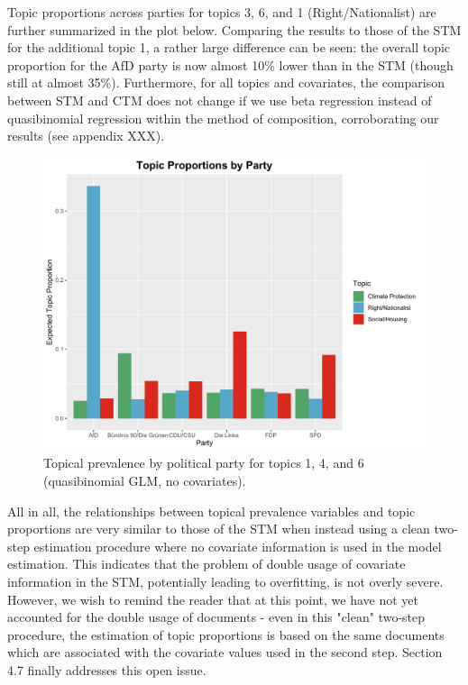 Topic proportions across parties for topics 3, 6, and 1 (Right/Nationalist) are further summarized in the plot below. Comparing the results to those of the STM for the additional topic 1, a rather large difference can be seen: the overall topic proportion for the AfD party is now almost 10\% lower than in the STM (though still at almost 35\%). Furthermore, for all topics and covariates, the comparison between STM and CTM does not change if we use beta regression instead of quasibinomial regression within the method of composition, corroborating our results (see appendix XXX).

\begin{figure}[h!]
  \centering
  \captionsetup{justification=centering,margin=2cm}
  \includegraphics[scale=0.5]{../plots/6_1/quasi_t146_cat_ctm.pdf}
  \caption{Topical prevalence by political party for topics 1, 4, and 6 (quasibinomial GLM, no covariates).}
  \label{fig:quasi_t146_cat_ctm}
\end{figure}

All in all, the relationships between topical prevalence variables and topic proportions are very similar to those of the STM when instead using a clean two-step estimation procedure where no covariate information is used in the model estimation. This indicates that the problem of double usage of covariate information in the STM, potentially leading to overfitting, is not overly severe. However, we wish to remind the reader that at this point, we have not yet accounted for the double usage of documents - even in this "clean" two-step procedure, the estimation of topic proportions is based on the same documents which are associated with the covariate values used in the second step. Section 4.7 finally addresses this open issue.
